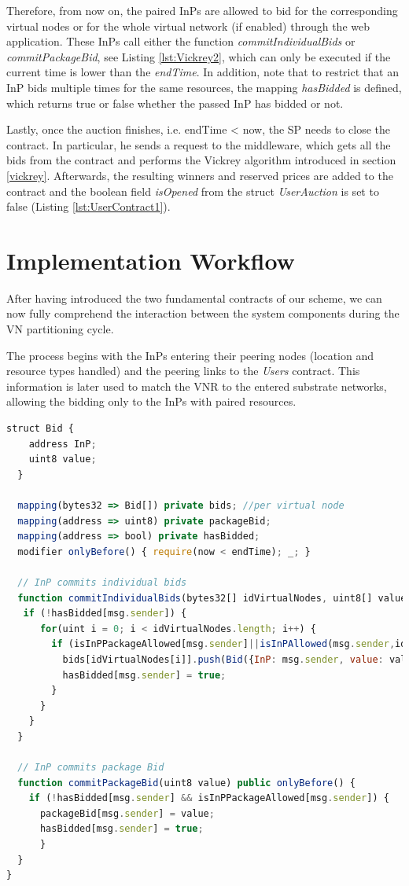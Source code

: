 Therefore, from now on, the paired InPs are allowed to bid for the corresponding virtual nodes or for the whole virtual network (if enabled) through the web application. These InPs call either the function \textit{commitIndividualBids} or \textit{commitPackageBid}, see Listing \ref{lst:Vickrey2}, which can only be executed if the current time is lower than the \textit{endTime}. In addition, note that to restrict that an InP bids multiple times for the same resources, the mapping \textit{hasBidded} is defined, which returns true or false whether the passed InP has bidded or not.

Lastly, once the auction finishes, i.e. endTime < now, the SP needs to close the contract. In particular, he sends a request to the middleware, which gets all the bids from the contract and performs the Vickrey algorithm introduced in section \ref{vickrey}. Afterwards, the resulting winners and reserved prices are added to the contract and the boolean field \textit{isOpened} from the struct \textit{UserAuction} is set to false (Listing \ref{lst:UserContract1}).

\section{Implementation Workflow}

After having introduced the two fundamental contracts of our scheme, we can now fully comprehend the interaction between the system components during the VN partitioning cycle. 

The process begins with the InPs entering their peering nodes (location and resource types handled) and the peering links to the \textit{Users} contract. This information is later used to match the VNR to the entered substrate networks, allowing the bidding only to the InPs with paired resources. 

\begin{lstlisting}[language=JavaScript,caption={Data structures and functions called for the individual and package bids of the Vickrey contract.}, label={lst:Vickrey2}]
  struct Bid {
    address InP;
    uint8 value;
  }
  
  mapping(bytes32 => Bid[]) private bids; //per virtual node
  mapping(address => uint8) private packageBid;
  mapping(address => bool) private hasBidded;
  modifier onlyBefore() { require(now < endTime); _; }
  
  // InP commits individual bids
  function commitIndividualBids(bytes32[] idVirtualNodes, uint8[] values) onlyBefore() {
   if (!hasBidded[msg.sender]) {
      for(uint i = 0; i < idVirtualNodes.length; i++) {
        if (isInPPackageAllowed[msg.sender]||isInPAllowed(msg.sender,idVirtualNodes[i])) {
          bids[idVirtualNodes[i]].push(Bid({InP: msg.sender, value: values[i]}));
          hasBidded[msg.sender] = true;
        }
      }
    }
  }

  // InP commits package Bid
  function commitPackageBid(uint8 value) public onlyBefore() {
    if (!hasBidded[msg.sender] && isInPPackageAllowed[msg.sender]) {
      packageBid[msg.sender] = value;
      hasBidded[msg.sender] = true;      
      }
  }
}
\end{lstlisting}

